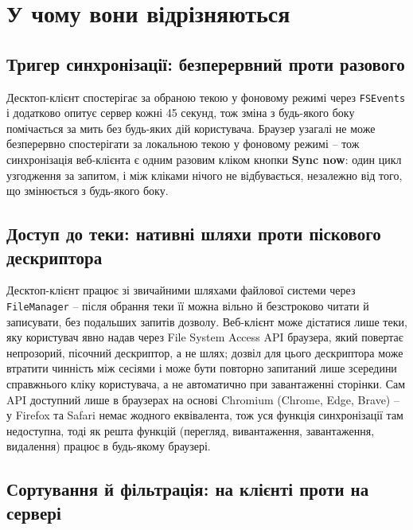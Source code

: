 \documentclass[12pt,a4paper]{article}
\begin{document}
\section{У чому вони відрізняються}
\label{sec:differences}

\subsection{Тригер синхронізації: безперервний проти разового}

Десктоп-клієнт спостерігає за обраною текою у фоновому режимі через \texttt{FSEvents} і додатково опитує сервер кожні 45 секунд, тож зміна з будь-якого боку помічається за мить без будь-яких дій користувача. Браузер узагалі не може безперервно спостерігати за локальною текою у фоновому режимі -- тож синхронізація веб-клієнта є одним разовим кліком кнопки \textbf{Sync now}: один цикл узгодження за запитом, і між кліками нічого не відбувається, незалежно від того, що змінюється з будь-якого боку.

\subsection{Доступ до теки: нативні шляхи проти піскового дескриптора}

Десктоп-клієнт працює зі звичайними шляхами файлової системи через \texttt{FileManager} -- після обрання теки її можна вільно й безстроково читати й записувати, без подальших запитів дозволу. Веб-клієнт може дістатися лише теки, яку користувач явно надав через File System Access API браузера, який повертає непрозорий, пісочний дескриптор, а не шлях; дозвіл для цього дескриптора може втратити чинність між сесіями і може бути повторно запитаний лише зсередини справжнього кліку користувача, а не автоматично при завантаженні сторінки. Сам API доступний лише в браузерах на основі Chromium (Chrome, Edge, Brave) -- у Firefox та Safari немає жодного еквівалента, тож уся функція синхронізації там недоступна, тоді як решта функцій (перегляд, вивантаження, завантаження, видалення) працює в будь-якому браузері.

\subsection{Сортування й фільтрація: на клієнті проти на сервері}
\end{document}
